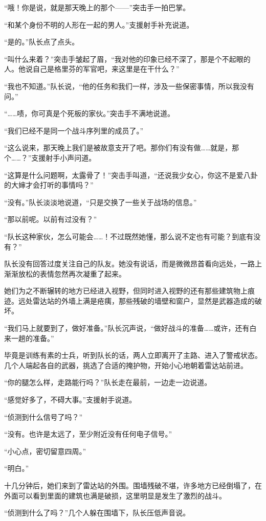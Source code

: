 “哦！你是说，就是那天晚上的那个——”突击手一拍巴掌。

“和某个身份不明的人形在一起的男人。”支援射手补充说道。

“是的。”队长点了点头。

“叫什么来着？”突击手皱起了眉，“我对他的印象已经不深了，那是个不起眼的人。他说自己是格里芬的军官吧，来这里是在干什么？”

“我也不知道。”队长说，“他的任务和我们一样，涉及一些保密事情，所以我没有问。”

“……啧，你可真是个死板的家伙。”突击手不满地说道。

“我们已经不是同一个战斗序列里的成员了。”

“这么说来，那天晚上我们是被故意支开了吧。那你们有没有做……就是，那个……？”支援射手小声问道。

“这算是什么问题啊，太露骨了！”突击手叫道，“还说我少女心，你这不是爱八卦的大婶才会打听的事情吗？”

“没有。”队长淡淡地说道，“只是交换了一些关于战场的信息。”

“那以前呢。以前有过没有？”

“队长这种家伙，怎么可能会……！不过既然她懂，那么说不定也有可能？到底有没有？”

队长没有回答过度关注自己的队友。她没有说话，而是微微昂首看向远处，一路上渐渐放松的表情忽然再次凝重了起来。

她们为之不断辗转的地方已经进入视野，但同时进入视野的还有那些建筑物上痕迹。远处雷达站的外墙上满是疮痍，那些残破的墙壁和窗户，显然是武器造成的破坏。

“我们马上就要到了，做好准备。”队长沉声说，“做好战斗的准备……或许，还有白来一趟的准备。”

毕竟是训练有素的士兵，听到队长的话，两人立即离开了主路、进入了警戒状态。几个人端起各自的武器，挑选了合适的掩护物，开始小心地朝着雷达站前进。

“你的腿怎么样，走路能行吗？”队长走在最前，一边走一边说道。

“感觉好多了，不碍大事。”支援射手说道。

“侦测到什么信号了吗？”

“没有。也许是太远了，至少附近没有任何电子信号。”

“小心点，密切留意四周。”

“明白。”

十几分钟后，她们来到了雷达站的外围。围墙残破不堪，许多地方已经倒塌了，在外面可以看到里面的建筑也满是破损，这里明显是发生了激烈的战斗。

“侦测到什么了吗？”几个人躲在围墙下，队长压低声音说。

